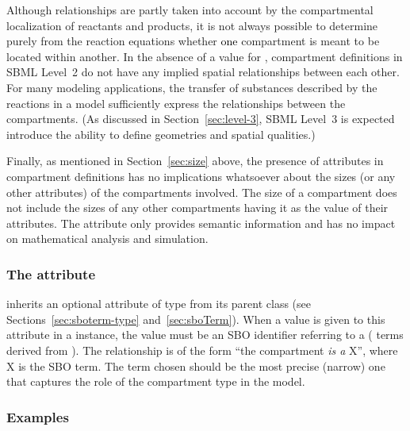 Although  relationships are partly taken into account
by the compartmental localization of reactants and products, it is
not always possible to determine purely from the reaction
equations whether \textcolor{black}{one} compartment is meant to be located within
another.  In the absence of a value for ,
compartment definitions in SBML Level~2 do not have any implied
spatial relationships between each other.  For many modeling
applications, the transfer of substances described by the
reactions in a model sufficiently express the relationships
between the compartments.  (As discussed in
Section~\ref{sec:level-3}, SBML Level~3 is expected introduce the
ability to define geometries and spatial qualities.)

\begin{blockChanged}

Finally, as mentioned in Section~\ref{sec:size} above, the
presence of  attributes in compartment definitions
has no implications whatsoever about the sizes (or any other
attributes) of the compartments involved.  The size of a
compartment does not include the sizes of any other compartments
having it as the value of their  attributes.  The
 attribute only provides semantic information and
has no impact on mathematical analysis and simulation.

\end{blockChanged}


\subsubsection{The  attribute}
\label{sec:compartment-sboterm}

\Compartment inherits an optional 
attribute of type  from its parent
class \SBase (see Sections~\ref{sec:sboterm-type}
and~\ref{sec:sboTerm}).  When a value is given to this
attribute in a \Compartment instance, the value must be
an SBO identifier referring to a  (\ie
terms derived from \sbomaterialentity).  The relationship is
of the form ``the compartment \emph{is a} X'', where X is the SBO
term.  The term chosen should be the most precise (narrow) one
that captures the role of the compartment type in the model.


\subsubsection{Examples}

